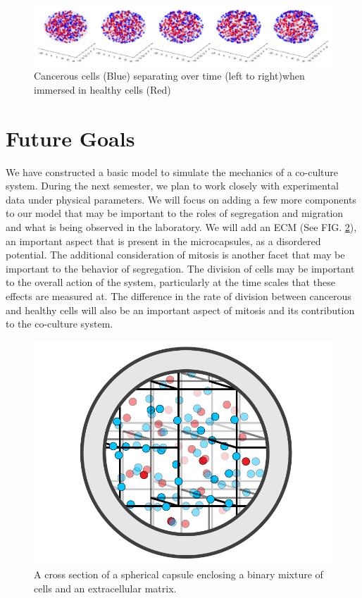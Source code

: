 \documentclass[aps,prb,twocolumn,groupedaddress,nofootinbib,floatfix]{revtex4}
\begin{document}
\begin{widetext}
\begin{figure}
  \includegraphics[width=\textwidth]{separation.png}
  \caption[separation]
    {Cancerous cells (Blue) separating over time (left to right)when immersed in healthy cells (Red)}
   \label{fig:separation}
\end{figure}
\end{widetext}

\section*{Future Goals}

We have constructed a basic model to simulate the mechanics of a co-culture system. During the next semester, we plan to work closely with experimental data under physical parameters. We will focus on adding a few more components to our model that may be important to the roles of segregation and migration and what is being observed in the laboratory.
We will add an ECM (See FIG. \ref{fig:capsuleECM}), an important aspect that is present in the microcapsules, as a disordered potential.
The additional consideration of mitosis is another facet that may be important to the behavior of segregation. The division of cells may be important to the overall action of the system, particularly at the time scales that these effects are measured at. The difference in the rate of division between cancerous and healthy cells will also be an important aspect of mitosis and its contribution to the co-culture system.

\begin{figure}
  \includegraphics[width=1.0\columnwidth]{Fig2.png}
  \caption[capsuleECM]
   {A cross section of a spherical capsule enclosing a binary mixture of 
   cells and an extracellular matrix.}
   \label{fig:capsuleECM}
\end{figure}
\end{document}

